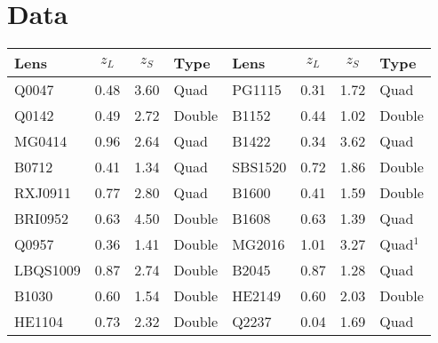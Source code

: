 \documentclass[10pt]{article}
\begin{document}
\section{Data}\label{sec:data}
\begin{table}[t]
 \centering
 \begin{minipage}{.64\textwidth} %
  \begin{tabular}{l c c l | l c c l}
   Lens & $z_{L}$ & $z_{S}$ & Type & Lens & $z_{L}$ & $z_{S}$ & Type\\ \hline \hline
   Q0047 & 0.48 & 3.60 & Quad & PG1115 & 0.31 & 1.72 & Quad\\
   Q0142 & 0.49 & 2.72 & Double & B1152 & 0.44 & 1.02 & Double\\
   MG0414 & 0.96 & 2.64 & Quad & B1422 & 0.34 & 3.62 & Quad\\
   B0712 & 0.41 & 1.34 & Quad & SBS1520 & 0.72 & 1.86 & Double\\
   RXJ0911 & 0.77 & 2.80 & Quad & B1600 & 0.41 & 1.59 & Double\\
   BRI0952 & 0.63 & 4.50 & Double & B1608 & 0.63 & 1.39 & Quad\\
   Q0957 & 0.36 & 1.41 & Double & MG2016 & 1.01 & 3.27 & Quad$^{1}$\\
   LBQS1009 & 0.87 & 2.74 & Double & B2045 & 0.87 & 1.28 & Quad\\
   B1030 & 0.60 & 1.54 & Double & HE2149 & 0.60 & 2.03 & Double\\
   HE1104 & 0.73 & 2.32 & Double & Q2237 & 0.04 & 1.69 & Quad\\
  \end{tabular}
  \captionsetup{width=\linewidth}
  \label{tab:overview}
 \end{minipage}
\end{table}
\end{document}
